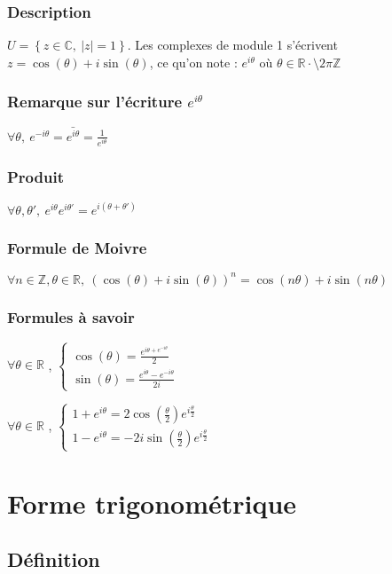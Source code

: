 \documentclass[12pt,a4paper,french]{book}
\begin{document}
			\subsubsection{Description}
			$U = \left\{z \in \mathbb{C}, \ \left|z\right| = 1\right\}$. Les complexes de module 1 s'écrivent $z = \cos(\theta)+i\sin(\theta)$, ce qu'on note : $ e^{i\theta}$ où $\theta \in \mathbb{R} \cdot\setminus 2\pi \mathbb{Z}$
			\subsubsection{Remarque sur l'écriture $e^{i\theta}$}
			$\forall \theta, \ e^{-i\theta} = \bar{e^{i\theta}} = \frac{1}{e^{i\theta}} $
			\subsubsection{Produit}
			$\forall \theta, \theta', \ e^{i\theta} e^{i\theta'} = e^{i(\theta+\theta')}$
			\subsubsection{Formule de Moivre}
			$\forall n \in \mathbb{Z}, \theta \in \mathbb{R},\ (\cos(\theta)+i\sin(\theta))^n = \cos(n\theta)+i\sin(n\theta)$
			\subsubsection{Formules à savoir}
				$\forall \theta \in \mathbb{R}$ , $\left\{ \begin{array}{ll}
				\cos(\theta) = \frac{e^{i\theta + e^{-i\theta}}}{2} \\
				\sin(\theta) = \frac{e^{i\theta}- e^{-i \theta}}{2i}
			\end{array} \right. $
			
			$\forall \theta \in \mathbb{R}$ , $\left\{ \begin{array}{ll}
				1+e^{i \theta} = 2\cos\left(\frac{\theta}{2}\right) e^{i \frac{\theta}{2} } \\
				1-e^{i \theta} = -2i\sin\left(\frac{\theta}{2}\right) e^{i \frac{\theta}{2} }
			\end{array} \right. $
	\section{Forme trigonométrique}
		\subsection{Définition}
\end{document}
